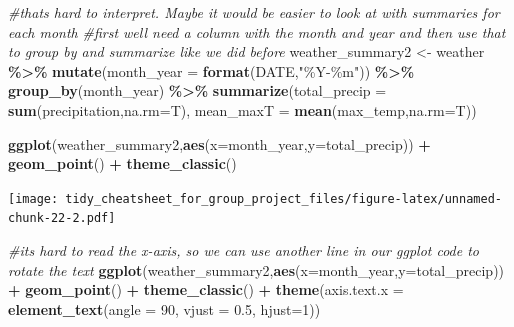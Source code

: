 \documentclass[
]{article}
\newenvironment{Shaded}{\begin{snugshade}}{\end{snugshade}}
\newcommand{\AttributeTok}[1]{\textcolor[rgb]{0.13,0.29,0.53}{#1}}
\newcommand{\CommentTok}[1]{\textcolor[rgb]{0.56,0.35,0.01}{\textit{#1}}}
\newcommand{\DecValTok}[1]{\textcolor[rgb]{0.00,0.00,0.81}{#1}}
\newcommand{\FloatTok}[1]{\textcolor[rgb]{0.00,0.00,0.81}{#1}}
\newcommand{\FunctionTok}[1]{\textcolor[rgb]{0.13,0.29,0.53}{\textbf{#1}}}
\newcommand{\NormalTok}[1]{#1}
\newcommand{\OtherTok}[1]{\textcolor[rgb]{0.56,0.35,0.01}{#1}}
\newcommand{\SpecialCharTok}[1]{\textcolor[rgb]{0.81,0.36,0.00}{\textbf{#1}}}
\newcommand{\StringTok}[1]{\textcolor[rgb]{0.31,0.60,0.02}{#1}}
\begin{document}
\begin{Shaded}
\begin{Highlighting}[]
\CommentTok{\#that\textquotesingle{}s hard to interpret. Maybe it would be easier to look at with summaries for each month}
\CommentTok{\#first we\textquotesingle{}ll need a column with the month and year and then use that to group by and summarize like we did before}
\NormalTok{weather\_summary2 }\OtherTok{\textless{}{-}}\NormalTok{ weather }\SpecialCharTok{\%\textgreater{}\%} 
  \FunctionTok{mutate}\NormalTok{(}\AttributeTok{month\_year =} \FunctionTok{format}\NormalTok{(DATE,}\StringTok{"\%Y{-}\%m"}\NormalTok{)) }\SpecialCharTok{\%\textgreater{}\%}
  \FunctionTok{group\_by}\NormalTok{(month\_year) }\SpecialCharTok{\%\textgreater{}\%}
  \FunctionTok{summarize}\NormalTok{(}\AttributeTok{total\_precip =} \FunctionTok{sum}\NormalTok{(precipitation,}\AttributeTok{na.rm=}\NormalTok{T),}
            \AttributeTok{mean\_maxT =} \FunctionTok{mean}\NormalTok{(max\_temp,}\AttributeTok{na.rm=}\NormalTok{T))}

\FunctionTok{ggplot}\NormalTok{(weather\_summary2,}\FunctionTok{aes}\NormalTok{(}\AttributeTok{x=}\NormalTok{month\_year,}\AttributeTok{y=}\NormalTok{total\_precip)) }\SpecialCharTok{+}
  \FunctionTok{geom\_point}\NormalTok{() }\SpecialCharTok{+}
  \FunctionTok{theme\_classic}\NormalTok{()}
\end{Highlighting}
\end{Shaded}

\texttt{[image: tidy\_cheatsheet\_for\_group\_project\_files/figure-latex/unnamed-chunk-22-2.pdf]}

\begin{Shaded}
\begin{Highlighting}[]
\CommentTok{\#it\textquotesingle{}s hard to read the x{-}axis, so we can use another line in our ggplot code to rotate the text}
\FunctionTok{ggplot}\NormalTok{(weather\_summary2,}\FunctionTok{aes}\NormalTok{(}\AttributeTok{x=}\NormalTok{month\_year,}\AttributeTok{y=}\NormalTok{total\_precip)) }\SpecialCharTok{+}
  \FunctionTok{geom\_point}\NormalTok{() }\SpecialCharTok{+}
  \FunctionTok{theme\_classic}\NormalTok{() }\SpecialCharTok{+}
  \FunctionTok{theme}\NormalTok{(}\AttributeTok{axis.text.x =} \FunctionTok{element\_text}\NormalTok{(}\AttributeTok{angle =} \DecValTok{90}\NormalTok{, }\AttributeTok{vjust =} \FloatTok{0.5}\NormalTok{, }\AttributeTok{hjust=}\DecValTok{1}\NormalTok{))}
\end{Highlighting}
\end{Shaded}
\end{document}
